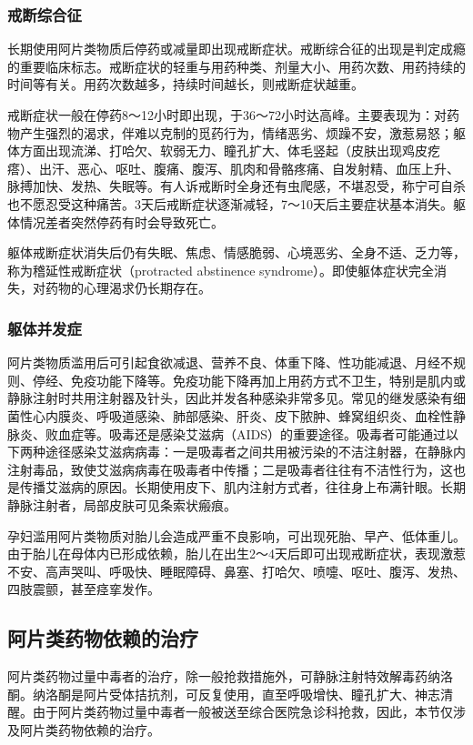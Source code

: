 \subsubsection{戒断综合征}

长期使用阿片类物质后停药或减量即出现戒断症状。戒断综合征的出现是判定成瘾的重要临床标志。戒断症状的轻重与用药种类、剂量大小、用药次数、用药持续的时间等有关。用药次数越多，持续时间越长，则戒断症状越重。

戒断症状一般在停药8～12小时即出现，于36～72小时达高峰。主要表现为：对药物产生强烈的渴求，伴难以克制的觅药行为，情绪恶劣、烦躁不安，激惹易怒；躯体方面出现流涕、打哈欠、软弱无力、瞳孔扩大、体毛竖起（皮肤出现鸡皮疙瘩）、出汗、恶心、呕吐、腹痛、腹泻、肌肉和骨骼疼痛、自发射精、血压上升、脉搏加快、发热、失眠等。有人诉戒断时全身还有虫爬感，不堪忍受，称宁可自杀也不愿忍受这种痛苦。3天后戒断症状逐渐减轻，7～10天后主要症状基本消失。躯体情况差者突然停药有时会导致死亡。

躯体戒断症状消失后仍有失眠、焦虑、情感脆弱、心境恶劣、全身不适、乏力等，称为稽延性戒断症状（protracted
abstinence
syndrome）。即使躯体症状完全消失，对药物的心理渴求仍长期存在。

\subsubsection{躯体并发症}

阿片类物质滥用后可引起食欲减退、营养不良、体重下降、性功能减退、月经不规则、停经、免疫功能下降等。免疫功能下降再加上用药方式不卫生，特别是肌内或静脉注射时共用注射器及针头，因此并发各种感染非常多见。常见的继发感染有细菌性心内膜炎、呼吸道感染、肺部感染、肝炎、皮下脓肿、蜂窝组织炎、血栓性静脉炎、败血症等。吸毒还是感染艾滋病（AIDS）的重要途径。吸毒者可能通过以下两种途径感染艾滋病病毒：一是吸毒者之间共用被污染的不洁注射器，在静脉内注射毒品，致使艾滋病病毒在吸毒者中传播；二是吸毒者往往有不洁性行为，这也是传播艾滋病的原因。长期使用皮下、肌内注射方式者，往往身上布满针眼。长期静脉注射者，局部皮肤可见条索状瘢痕。

孕妇滥用阿片类物质对胎儿会造成严重不良影响，可出现死胎、早产、低体重儿。由于胎儿在母体内已形成依赖，胎儿在出生2～4天后即可出现戒断症状，表现激惹不安、高声哭叫、呼吸快、睡眠障碍、鼻塞、打哈欠、喷嚏、呕吐、腹泻、发热、四肢震颤，甚至痉挛发作。

\subsection{阿片类药物依赖的治疗}

阿片类药物过量中毒者的治疗，除一般抢救措施外，可静脉注射特效解毒药纳洛酮。纳洛酮是阿片受体拮抗剂，可反复使用，直至呼吸增快、瞳孔扩大、神志清醒。由于阿片类药物过量中毒者一般被送至综合医院急诊科抢救，因此，本节仅涉及阿片类药物依赖的治疗。

